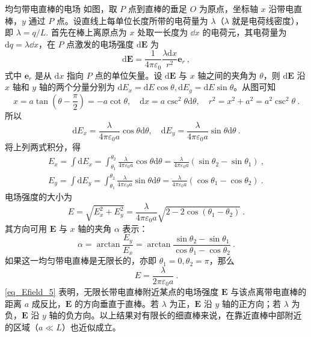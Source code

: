\begin{example}{均匀带电直棒的电场}
如图，取 $P$ 点到直棒的垂足 $O$ 为原点，坐标轴 $x$ 沿带电直棒，$y$ 通过 $P$ 点。设直线上每单位长度所带的电荷量为 $\lambda$（$\lambda$ 就是电荷线密度），即 $\lambda=q/L$. 首先在棒上离原点为 $x$ 处取一长度为 $\dd{x}$ 的电荷元，其电荷量为 $\mathrm dq=\lambda\dd{x}$，在 $P$ 点激发的电场强度 $\mathrm d\mathbf E$ 为
\begin{equation}
\mathrm{d} \mathbf{E}=\frac{1}{4 \pi \varepsilon_{0}} \frac{\lambda \mathrm{d} x}{r^{2}} \mathbf e_r~,
\end{equation}
式中 $\mathbf e_r$ 是从 $\mathrm dx$ 指向 $P$ 点的单位矢量。设 $\mathrm{d} \mathbf{E}$ 与 $x$ 轴之间的夹角为 $\theta$，则 $\mathrm{d} \mathbf{E}$ 沿 $x$ 轴和 $y$ 轴的两个分量分别为 $\mathrm{d} E_{x}=\mathrm{d} E \cos \theta, \mathrm{d} E_{y}=\mathrm{d} E \sin \theta$。从图可知
\begin{equation}
x=a \tan \left(\theta-\frac{\pi}{2}\right)=-a \cot \theta, \quad \mathrm{d} x=a \csc ^{2} \theta \mathrm{d} \theta, \quad r^{2}=x^{2}+a^{2}=a^{2} \csc ^{2} \theta~.
\end{equation}
所以
\begin{equation}
\mathrm{d} E_{x}=\frac{\lambda}{4 \pi \varepsilon_{0} a} \cos \theta \mathrm{d} \theta, \quad \mathrm{d} E_{y}=\frac{\lambda}{4 \pi \varepsilon_{0} a} \sin \theta \mathrm{d} \theta~.
\end{equation}
将上列两式积分，得
\begin{equation}
\begin{aligned}E_{x}=\int \mathrm{d} E_{x}=\int_{\theta_{1}}^{\theta_{2}} \frac{\lambda}{4 \pi \varepsilon_{0} a} \cos \theta \mathrm{d} \theta=\frac{\lambda}{4 \pi \varepsilon_{0} a}\left(\sin \theta_{2}-\sin \theta_{1}\right) ~,\\ E_{y}=\int \mathrm{d} E_{y}=\int_{\theta_{1}}^{\theta_{2}} \frac{\lambda}{4 \pi \varepsilon_{0} a} \sin \theta \mathrm{d} \theta=\frac{\lambda}{4 \pi \varepsilon_{0} a}\left(\cos \theta_{1}-\cos \theta_{2}\right)~.\end{aligned}
\end{equation}
电场强度的大小为
\begin{equation}
E=\sqrt{E_{x}^{2}+E_{y}^{2}}=\frac{\lambda}{4 \pi \varepsilon_{0} a} \sqrt{2-2 \cos \left(\theta_{1}-\theta_{2}\right)}~.
\end{equation}
其方向可用 $\mathbf E$ 与 $x$ 轴的夹角 $\alpha$ 表示：
\begin{equation}
\alpha=\arctan \frac{E_{y}}{E_{x}}=\arctan \frac{\sin \theta_{2}-\sin \theta_{1}}{\cos \theta_{1}-\cos \theta_{2}}~.
\end{equation}
如果这一均匀带电直棒是无限长的，亦即 $\theta_{1}=0, \theta_{2}=\pi$，那么
\begin{equation} \label{eq_Efield_5}
E=\frac{\lambda}{2 \pi \varepsilon_{0} a}~.
\end{equation}
\autoref{eq_Efield_5} 表明，无限长带电直棒附近某点的电场强度 $\mathbf E$ 与该点离带电直棒的距离 $a$ 成反比，$\mathbf  E$ 的方向垂直于直棒。若 $\lambda$ 为正，$\mathbf E$ 沿 $y$ 轴的正方向；若 $\lambda$ 为负，$\mathbf E$ 沿 $y$ 轴的负方向。以上结果对有限长的细直棒来说，在靠近直棒中部附近的区域（$a\ll L$）也近似成立。
\end{example}


